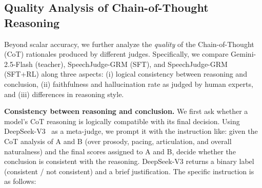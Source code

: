 \documentclass[]{bytedance_seed}
\begin{document}
\subsection{Quality Analysis of Chain-of-Thought Reasoning}\label{app:grm-cot-quality}

Beyond scalar accuracy, we further analyze the \textit{quality} of the
Chain-of-Thought (CoT) rationales produced by different judges.
Specifically, we compare Gemini-2.5-Flash (teacher), SpeechJudge-GRM (SFT),
and SpeechJudge-GRM (SFT+RL) along three aspects:
(i) logical consistency between reasoning and conclusion,
(ii) faithfulness and hallucination rate as judged by human experts, and
(iii) differences in reasoning style.

\textbf{Consistency between reasoning and conclusion.}\quad
We first ask whether a model’s CoT reasoning is logically compatible with its
final decision.
Using DeepSeek-V3~\citep{deepseek-v3} as a meta-judge, we prompt it with the instruction like: given the CoT analysis of A and
B (over prosody, pacing, articulation, and overall naturalness) and the final
scores assigned to A and B, decide whether the conclusion is consistent with
the reasoning. DeepSeek-V3 returns a binary label (consistent / not consistent) and a brief
justification. The specific instruction is as follows:
\end{document}
